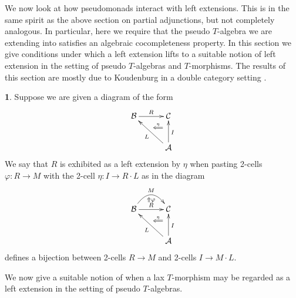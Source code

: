\documentclass[a4paper,oneside,english]{amsart}
\numberwithin{equation}{section}
\numberwithin{figure}{section}
\theoremstyle{plain}
\theoremstyle{definition}
\newtheorem{defn}[thm]{\protect\definitionname}
\theoremstyle{remark}
\theoremstyle{definition}
\theoremstyle{plain}
\theoremstyle{plain}
\theoremstyle{plain}
\providecommand{\definitionname}{Definition}
\begin{document}
We now look at how pseudomonads interact with left extensions. This
is in the same spirit as the above section on partial adjunctions,
but not completely analogous. In particular, here we require that
the pseudo $T$-algebra we are extending into satisfies an algebraic
cocompleteness property. In this section we give conditions under
which a left extension lifts to a suitable notion of left extension
in the setting of pseudo $T$-algebras and $T$-morphisms. The results
of this section are mostly due to Koudenburg in a double category
setting \cite{roald2015}. 
\begin{defn}
Suppose we are given a diagram of the form
\[
\xymatrix@=1em{\mathcal{B}\ar[rr]^{R} &  & \mathcal{C}\ar@{}[ld]|-{\stackrel{\eta}{\Longleftarrow}}\\
 & \;\\
 &  & \mathcal{A}\ar[uu]_{I}\ar[uull]^{L}
}
\]
We say that $R$ is exhibited as a left extension by $\eta$ when
pasting 2-cells $\varphi:R\to M$ with the 2-cell $\eta:I\to R\cdot L$
as in the diagram 
\[
\xymatrix@=1em{\mathcal{B}\ar[rr]^{R}\ar@/^{1.5pc}/[rr]_{\Uparrow\varphi}^{M} &  & \mathcal{C}\ar@{}[ld]|-{\stackrel{\eta}{\Longleftarrow}}\\
 & \;\\
 &  & \mathcal{A}\ar[uu]_{I}\ar[uull]^{L}
}
\]
defines a bijection between 2-cells $R\to M$ and 2-cells $I\to M\cdot L$.
\end{defn}
We now give a suitable notion of when a lax $T$-morphism may be regarded
as a left extension in the setting of pseudo $T$-algebras.
\end{document}

